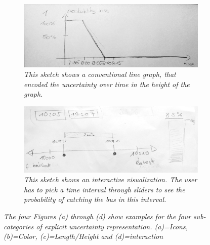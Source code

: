 \begin{itemize}
\begin{figure}[h]
		\begin{subfigure}[t]{.4\textwidth}
			\centering
			\includegraphics[width=\linewidth]{figures/length.jpg}
			\caption{\textit{This sketch shows a conventional line graph, that encoded the uncertainty over time in the height of the graph.}}
			\label{fig:length}
		\end{subfigure}
		\hfill
		\begin{subfigure}[t]{.4\textwidth}
			\centering
			\includegraphics[width=\linewidth]{figures/interaction.jpg}
			\caption{\textit{This sketch shows an interactive visualization. The user has to pick a time interval through sliders to see the probability of catching the bus in this interval.}}
			\label{fig:interaction}
		\end{subfigure}
		\caption{\textit{The four Figures (a) through (d) show examples for the four sub-categories of explicit uncertainty representation. (a)=Icons, (b)=Color, (c)=Length/Height and (d)=interaction}}
		\label{fig:explicit}
	\end{figure}
	

\end{itemize}
